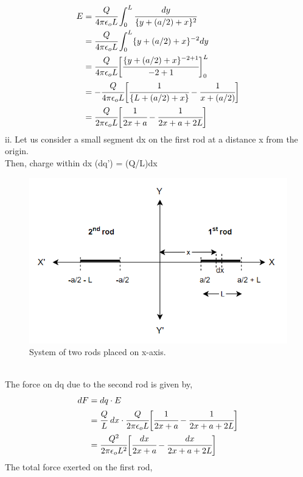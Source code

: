 \begin{align*}
       E &= \cfrac{Q}{4 \pi \epsilon_o L} \int_0^L \cfrac{dy}{{\{y+ (a/2) + x\}^2}}\\
         &= \cfrac{Q}{4 \pi \epsilon_o L} \int_0^L \{y+ (a/2) + x\}^{-2} dy\\
         &= \cfrac{Q}{4 \pi \epsilon_o L} \bigg[\cfrac{\{y+ (a/2) + x\}^{-2+1}}{-2+1}\bigg]_0^L\\
         &= -\cfrac{Q}{4 \pi \epsilon_o L} \bigg[\cfrac{1}{\{L+ (a/2) + x\}} - \cfrac{1}{x + (a/2)}\bigg ]\\
         &= \cfrac{Q}{2 \pi \epsilon_o L} \bigg[\cfrac{1}{2x+a} - \cfrac{1}{2x + a + 2L}\bigg ]
\end{align*}
ii. Let us consider a small segment dx on the first rod at a distance x from the origin.\\ 
Then, charge within dx (dq') = (Q/L)dx
\vspace{3pt}
\begin{figure}[h]
    \centering
    \includegraphics[scale = 0.58]{figures/elecmag/2rd2.png}
    \caption{System of two rods placed on x-axis.}
    \label{2rd2}
\end{figure}
\\
The force on dq due to the second rod is given by,
\begin{align*}
    dF &= dq \cdot E\\
       &=\cfrac{Q}{L}\hspace{3pt} dx \cdot \cfrac{Q}{2 \pi \epsilon_o L} \bigg[\cfrac{1}{2x+a} - \cfrac{1}{2x + a + 2L}\bigg ]\\
        &=\cfrac{Q^2}{2 \pi \epsilon_o L^2} \bigg[\cfrac{dx}{2x+a} - \cfrac{dx}{2x + a + 2L}\bigg ]
\end{align*}
The total force exerted on the first rod, 
